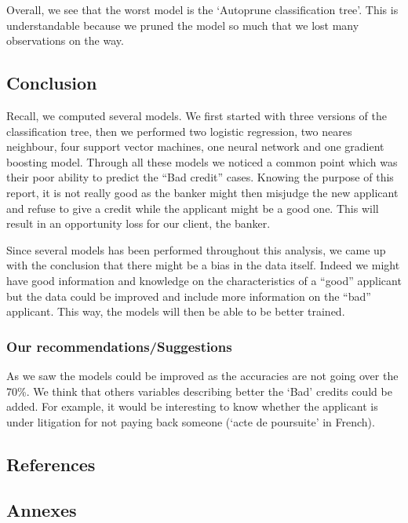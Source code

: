 \documentclass[
]{article}
\begin{document}
Overall, we see that the worst model is the `Autoprune classification
tree'. This is understandable because we pruned the model so much that
we lost many observations on the way.

\hypertarget{conclusion}{%
\subsection{Conclusion}\label{conclusion}}

Recall, we computed several models. We first started with three versions
of the classification tree, then we performed two logistic regression,
two neares neighbour, four support vector machines, one neural network
and one gradient boosting model. Through all these models we noticed a
common point which was their poor ability to predict the ``Bad credit''
cases. Knowing the purpose of this report, it is not really good as the
banker might then misjudge the new applicant and refuse to give a credit
while the applicant might be a good one. This will result in an
opportunity loss for our client, the banker.

Since several models has been performed throughout this analysis, we
came up with the conclusion that there might be a bias in the data
itself. Indeed we might have good information and knowledge on the
characteristics of a ``good'' applicant but the data could be improved
and include more information on the ``bad'' applicant. This way, the
models will then be able to be better trained.

\hypertarget{our-recommendationssuggestions}{%
\subsubsection{Our
recommendations/Suggestions}\label{our-recommendationssuggestions}}

As we saw the models could be improved as the accuracies are not going
over the 70\%. We think that others variables describing better the
`Bad' credits could be added. For example, it would be interesting to
know whether the applicant is under litigation for not paying back
someone (`acte de poursuite' in French).

\hypertarget{references}{%
\subsection{References}\label{references}}

\hypertarget{annexes}{%
\subsection{Annexes}\label{annexes}}
\end{document}

